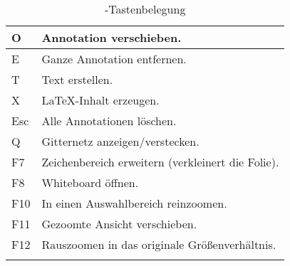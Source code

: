 \begin{longtable}{|p{}|l|}
	\hline
	O & Annotation verschieben.\\
	\hline
	E & Ganze Annotation entfernen.\\
	\hline
	T & Text erstellen.\\
	\hline
	X & LaTeX-Inhalt erzeugen.\\
	\hline
	Esc & Alle Annotationen löschen.\\
	\hline
	Q & Gitternetz anzeigen/verstecken.\\
	\hline
	F7 & Zeichenbereich erweitern (verkleinert die Folie).\\
	\hline
	F8 & Whiteboard öffnen.\\
	\hline
	F10 & In einen Auswahlbereich reinzoomen.\\
	\hline
	F11 & Gezoomte Ansicht verschieben.\\
	\hline
	F12 & Rauszoomen in das originale Größenverhältnis.\\
	\hline
	\caption{\lectPresenter{}-Tastenbelegung}
	\label{tab:shortcuts}
\end{longtable}

\pagebreak